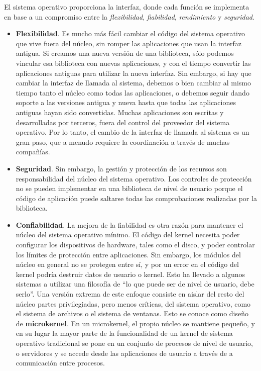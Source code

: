\documentclass[10pt]{book}
\begin{document}
El sistema operativo proporciona la interfaz, donde cada función se implementa en base a un compromiso entre la \textit{flexibilidad}, \textit{fiabilidad}, \textit{rendimiento} y \textit{seguridad}.

\begin{itemize}
\item \textbf{Flexibilidad}. Es mucho más fácil cambiar el código del sistema operativo que vive fuera del núcleo, sin romper las aplicaciones que usan la interfaz antigua. Si creamos una nueva versión de una biblioteca, sólo podemos vincular esa biblioteca con nuevas aplicaciones, y con el tiempo convertir las aplicaciones antiguas para utilizar la nueva interfaz. Sin embargo, si hay que cambiar la interfaz de llamada al sistema, debemos o bien cambiar al mismo tiempo tanto el núcleo como todas las aplicaciones, o debemos seguir dando soporte a las versiones antigua y nueva hasta que todas las aplicaciones antiguas hayan sido convertidas. Muchas aplicaciones son escritas y desarrolladas por terceros, fuera del control del proveedor del sistema operativo. Por lo tanto, el cambio de la interfaz de llamada al sistema es un gran paso, que a menudo requiere la coordinación a través de muchas compañías.

\item \textbf{Seguridad}. Sin embargo, la gestión y protección de los recursos son responsabilidad del núcleo del sistema operativo. Los controles de protección no se pueden implementar en una biblioteca de nivel de usuario porque el código de aplicación puede saltarse todas las comprobaciones realizadas por la biblioteca.

\item \textbf{Confiabilidad}. La mejora de la fiabilidad es otra razón para mantener el núcleo del sistema operativo mínimo. El código del kernel necesita poder configurar los dispositivos de hardware, tales como el disco, y poder controlar los límites de protección entre aplicaciones. Sin embargo, los módulos del núcleo en general no se protegen entre sí, y por un error en el código del kernel podría destruir datos de usuario o kernel. Esto ha llevado a algunos sistemas a utilizar una filosofía de ``lo que puede ser de nivel de usuario, debe serlo''. Una versión extrema de este enfoque consiste en aislar del resto del núcleo partes privilegiadas, pero menos críticas, del sistema operativo, como el sistema de archivos o el sistema de ventanas. Esto se conoce como diseño de \textbf{microkernel}. En un microkernel, el propio núcleo se mantiene pequeño, y en su lugar la mayor parte de la funcionalidad de un kernel de sistema operativo tradicional se pone en un conjunto de procesos de nivel de usuario, o servidores y se accede desde las aplicaciones de usuario a través de a comunicación entre procesos.


\end{itemize}
\end{document}
